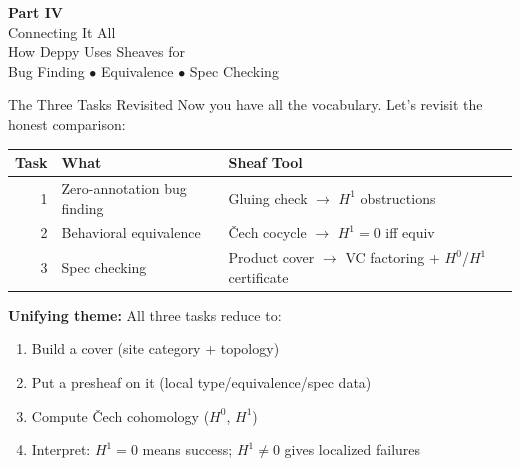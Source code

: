 \documentclass[aspectratio=169,10pt]{beamer}
\begin{document}

\begin{frame}[plain]
\begin{center}
\vspace{2cm}
{\Huge\textbf{Part IV}}\\[0.3em]
{\Large Connecting It All}\\[1em]
{\normalsize How Deppy Uses Sheaves for\\
Bug Finding $\bullet$ Equivalence $\bullet$ Spec Checking}
\end{center}
\end{frame}

\begin{frame}{The Three Tasks Revisited}
Now you have all the vocabulary. Let's revisit the honest comparison:

\vspace{0.3em}
\renewcommand{\arraystretch}{1.4}
\begin{tabular}{@{}rp{5cm}p{4.5cm}@{}}
\textbf{Task} & \textbf{What} & \textbf{Sheaf Tool} \\
\midrule
1 & Zero-annotation bug finding & Gluing check $\to$ $H^1$ obstructions \\
2 & Behavioral equivalence & \v{C}ech cocycle $\to$ $H^1 = 0$ iff equiv \\
3 & Spec checking & Product cover $\to$ VC factoring + $H^0$/$H^1$ certificate \\
\end{tabular}

\vspace{0.5em}
\textbf{Unifying theme:} All three tasks reduce to:
\begin{enumerate}
  \item Build a cover (site category + topology)
  \item Put a presheaf on it (local type/equivalence/spec data)
  \item Compute \v{C}ech cohomology ($H^0$, $H^1$)
  \item Interpret: $H^1 = 0$ means success; $H^1 \neq 0$ gives localized failures
\end{enumerate}
\end{frame}
\end{document}
